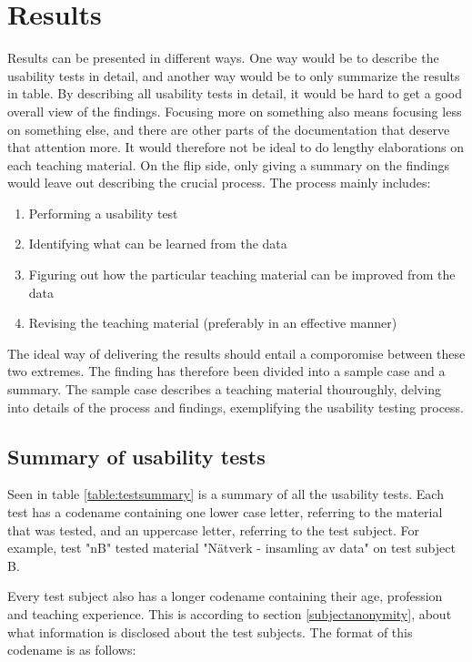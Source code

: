 \chapter{Results}
Results can be presented in different ways. One way would be to describe the usability tests in detail, and another way would be to only summarize the results in table. 
By describing all usability tests in detail, it would be hard to get a good overall view of the findings. Focusing more on something also means focusing less on something 
else, and there are other parts of the documentation that deserve that attention more. It would therefore not be ideal to do lengthy elaborations on each teaching material.
On the flip side, only giving a summary on the findings would leave out describing the crucial process. The process mainly includes:
\begin{enumerate}
	\item Performing a usability test
	\item Identifying what can be learned from the data
	\item Figuring out how the particular teaching material can be improved from the data
	\item Revising the teaching material (preferably in an effective manner)
\end{enumerate}
The ideal way of delivering the results should entail a comporomise between these two extremes. The finding has therefore been divided into a sample case and a summary.
The sample case describes a teaching material thouroughly, delving into details of the process and findings, exemplifying the usability testing process. 

\section{Summary of usability tests}

Seen in table \ref{table:testsummary} is a summary of all the usability tests. Each test has a codename containing one lower case letter, referring to the material that was tested, and an uppercase letter, referring to the test subject. For example, test "nB" tested material "Nätverk - insamling av data" on test subject B. 

Every test subject also has a longer codename containing their age, profession and teaching experience. This is according to section \ref{subjectanonymity}, about what information is disclosed about the test subjects. The format of this codename is as follows:

